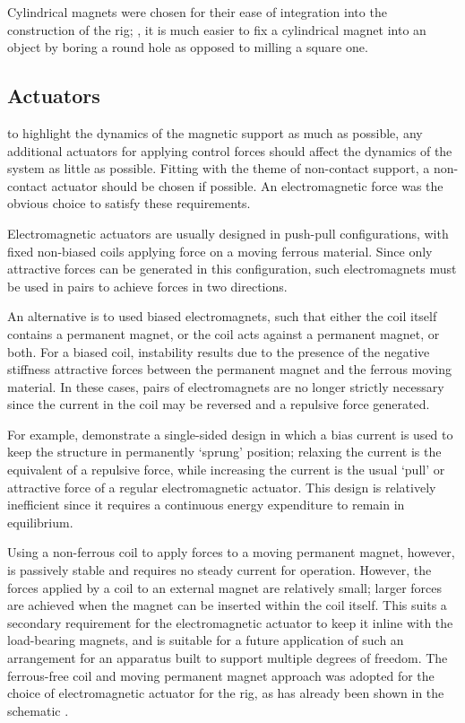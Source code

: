 \documentclass[11pt,a4paper]{memoir}
\begin{document}
Cylindrical magnets were chosen for their ease of integration into the
construction of the rig; \eg, it is much easier to fix a cylindrical magnet
into an object by boring a round hole as opposed to milling a square one.

\subsection{Actuators}

to highlight the dynamics of the magnetic support as much as possible, any
additional actuators for applying control forces should affect the dynamics of
the system as little as possible. Fitting with the theme of non-contact
support, a non-contact actuator should be chosen if possible. An
electromagnetic force was the obvious choice to satisfy these requirements.

Electromagnetic actuators are usually designed in push-pull configurations,
with fixed non-biased coils applying force on a moving ferrous material. Since
only attractive forces can be generated in this configuration, such
electromagnets must be used in pairs to achieve forces in two directions.

An alternative is to used biased electromagnets, such that either the coil
itself contains a permanent magnet, or the coil acts against a permanent
magnet, or both. For a biased coil, instability results due to the presence of
the negative stiffness attractive forces between the permanent magnet and the
ferrous moving material. In these cases, pairs of electromagnets are no longer
strictly necessary since the current in the coil may be reversed and a
repulsive force generated.

For example, \textcite{nandi2009} demonstrate a single-sided design in which a
bias current is used to keep the structure in permanently `sprung' position;
relaxing the current is the equivalent of a repulsive force, while increasing
the current is the usual `pull' or attractive force of a regular
electromagnetic actuator. This design is relatively inefficient since it
requires a continuous energy expenditure to remain in equilibrium.

Using a non-ferrous coil to apply forces to a moving permanent magnet,
however, is passively stable and requires no steady current for operation.
However, the forces applied by a coil to an external magnet are relatively
small; larger forces are achieved when the magnet can be inserted within the
coil itself. This suits a secondary requirement for the electromagnetic
actuator to keep it inline with the load-bearing magnets, and is suitable for a
future application of such an arrangement for an apparatus built to support
multiple degrees of freedom. The ferrous-free coil and moving permanent magnet
approach was adopted for the choice of electromagnetic actuator for the rig,
as has already been shown in the schematic .
\end{document}
